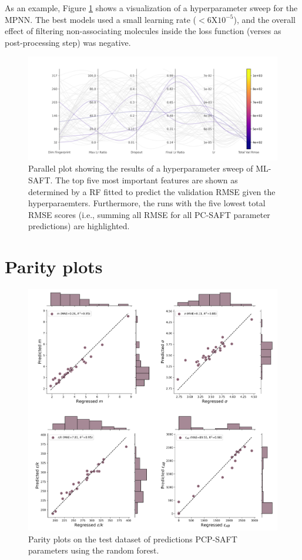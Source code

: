 As an example, Figure \ref{fig:ML-SAFT_sweep_parallel_plot} shows a visualization of a hyperparameter sweep for the MPNN. The best models used a small learning rate ($<6\text{X}  10^{-5}$), and the overall effect of filtering non-associating molecules inside the loss function (verses as post-processing step) was negative.

\begin{figure}
    \centering
    \includegraphics[width=\textwidth]{gfx/Chapter08/pyg_sweep_u157us_parallel_plot_total_val_rmse.png}
    \caption{Parallel plot showing the results of a hyperparameter sweep of ML-SAFT. The top five most important features are shown as determined by a RF fitted to predict the validation RMSE given the hyperparaemters. Furthermore, the runs with the five lowest total RMSE scores (i.e., summing all RMSE for all PC-SAFT parameter predictions) are highlighted.}
    \label{fig:ML-SAFT_sweep_parallel_plot}
\end{figure}

\section{Parity plots}\label{app:parity}

\begin{figure}
    \centering
    \includegraphics[width=\textwidth]{gfx/Chapter08/rf_parity_plots.png}
    \caption{Parity plots on the test dataset of predictions PCP-SAFT parameters using the random forest.}
    \label{fig:rf}
\end{figure}


